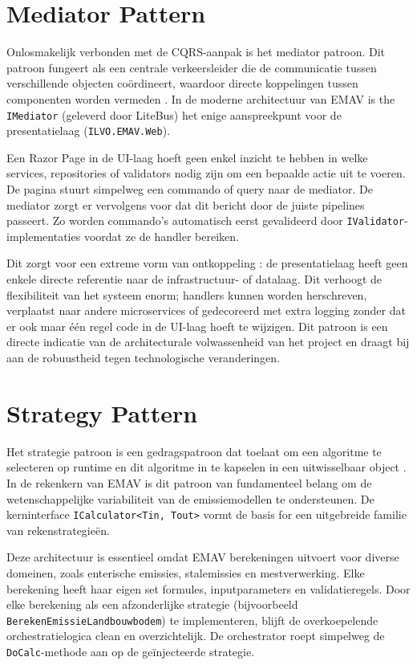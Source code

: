\section{Mediator Pattern}
Onlosmakelijk verbonden met de CQRS-aanpak is het mediator patroon. 
Dit patroon fungeert als een centrale verkeersleider die de communicatie tussen verschillende objecten coördineert, waardoor directe koppelingen tussen componenten worden vermeden \autocite{gof1994}. 
In de moderne architectuur van EMAV is the \texttt{IMediator} (geleverd door LiteBus) het enige aanspreekpunt voor de presentatielaag (\texttt{ILVO.EMAV.Web}).

Een Razor Page in de UI-laag hoeft geen enkel inzicht te hebben in welke services, repositories of validators nodig zijn om een bepaalde actie uit te voeren. 
De pagina stuurt simpelweg een commando of query naar de mediator. 
De mediator zorgt er vervolgens voor dat dit bericht door de juiste pipelines passeert. 
Zo worden commando's automatisch eerst gevalideerd door \texttt{IValidator}-implementaties voordat ze de handler bereiken.

Dit zorgt voor een extreme vorm van ontkoppeling : de presentatielaag heeft geen enkele directe referentie naar de infrastructuur- of datalaag. 
Dit verhoogt de flexibiliteit van het systeem enorm; handlers kunnen worden herschreven, verplaatst naar andere microservices of gedecoreerd met extra logging zonder dat er ook maar één regel code in de UI-laag hoeft te wijzigen. 
Dit patroon is een directe indicatie van de architecturale volwassenheid van het project en draagt bij aan de robuustheid tegen technologische veranderingen.

\section{Strategy Pattern}
Het strategie patroon is een gedragspatroon dat toelaat om een algoritme te selecteren op runtime en dit algoritme in te kapselen in een uitwisselbaar object \autocite{gof1994}. 
In de rekenkern van EMAV is dit patroon van fundamenteel belang om de wetenschappelijke variabiliteit van de emissiemodellen te ondersteunen. 
De kerninterface \texttt{ICalculator<Tin, Tout>} vormt de basis for een uitgebreide familie van rekenstrategieën.

Deze architectuur is essentieel omdat EMAV berekeningen uitvoert voor diverse domeinen, zoals enterische emissies, stalemissies en mestverwerking. 
Elke berekening heeft haar eigen set formules, inputparameters en validatieregels. 
Door elke berekening als een afzonderlijke strategie (bijvoorbeeld \texttt{BerekenEmissieLandbouwbodem}) te implementeren, blijft de overkoepelende orchestratielogica clean en overzichtelijk. 
De orchestrator roept simpelweg de \texttt{DoCalc}-methode aan op de geïnjecteerde strategie.


